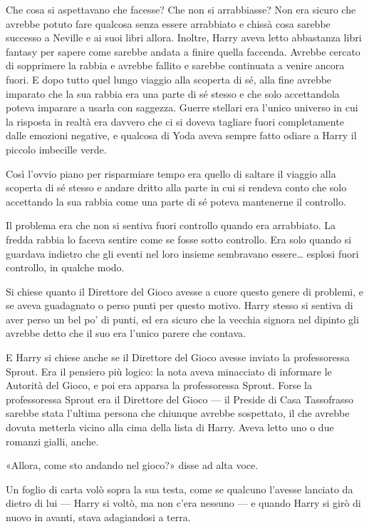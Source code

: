 Che cosa si aspettavano che facesse? Che non si arrabbiasse? Non era sicuro che avrebbe potuto fare qualcosa senza essere arrabbiato e chissà cosa sarebbe successo a Neville e ai suoi libri allora. Inoltre, Harry aveva letto abbastanza libri fantasy per sapere come sarebbe andata a finire quella faccenda. Avrebbe cercato di sopprimere la rabbia e avrebbe fallito e sarebbe continuata a venire ancora fuori. E dopo tutto quel lungo viaggio alla scoperta di sé, alla fine avrebbe imparato che la sua rabbia era una parte di sé stesso e che solo accettandola poteva imparare a usarla con saggezza. Guerre stellari era l’unico universo in cui la risposta in realtà era davvero che ci si doveva tagliare fuori completamente dalle emozioni negative, e qualcosa di Yoda aveva sempre fatto odiare a Harry il piccolo imbecille verde.

Così l’ovvio piano per risparmiare tempo era quello di saltare il viaggio alla scoperta di sé stesso e andare dritto alla parte in cui si rendeva conto che solo accettando la sua rabbia come una parte di sé poteva mantenerne il controllo.

Il problema era che non si sentiva fuori controllo quando era arrabbiato. La fredda rabbia lo faceva sentire come se fosse sotto controllo. Era solo quando si guardava indietro che gli eventi nel loro insieme sembravano essere… esplosi fuori controllo, in qualche modo.

Si chiese quanto il Direttore del Gioco avesse a cuore questo genere di problemi, e se aveva guadagnato o perso punti per questo motivo. Harry stesso si sentiva di aver perso un bel po’ di punti, ed era sicuro che la vecchia signora nel dipinto gli avrebbe detto che il suo era l’unico parere che contava.

E Harry si chiese anche se il Direttore del Gioco avesse inviato la professoressa Sprout. Era il pensiero più logico: la nota aveva minacciato di informare le Autorità del Gioco, e poi era apparsa la professoressa Sprout. Forse la professoressa Sprout era il Direttore del Gioco — il Preside di Casa Tassofrasso sarebbe stata l’ultima persona che chiunque avrebbe sospettato, il che avrebbe dovuta metterla vicino alla cima della lista di Harry. Aveva letto uno o due romanzi gialli, anche.

«Allora, come sto andando nel gioco?» disse ad alta voce.

Un foglio di carta volò sopra la sua testa, come se qualcuno l’avesse lanciato da dietro di lui — Harry si voltò, ma non c’era nessuno — e quando Harry si girò di nuovo in avanti, stava adagiandosi a terra.

